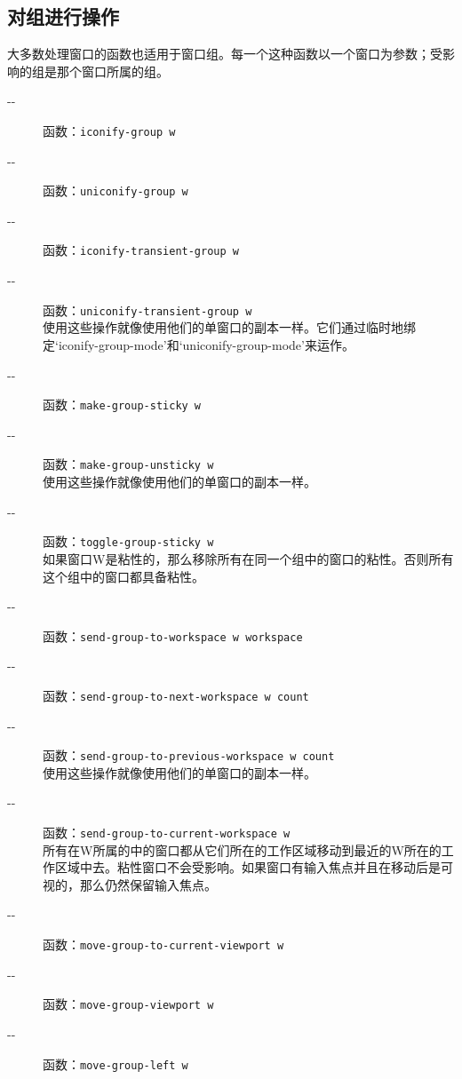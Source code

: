 \documentclass{book}
\begin{document}
\begin{CJK*}{UTF8}{gbsn}
\subsection{对组进行操作}
大多数处理窗口的函数也适用于窗口组。每一个这种函数以一个窗口为参数；受影响的组是那个窗口所属的组。
\begin{description}
\item[-{}-] 函数：\verb|iconify-group w|\\
\item[-{}-] 函数：\verb|uniconify-group w|\\
\item[-{}-] 函数：\verb|iconify-transient-group w|\\
\item[-{}-] 函数：\verb|uniconify-transient-group w|\\
使用这些操作就像使用他们的单窗口的副本一样。它们通过临时地绑定`iconify-group-mode'和`uniconify-group-mode'来运作。
\item[-{}-] 函数：\verb|make-group-sticky w|\\
\item[-{}-] 函数：\verb|make-group-unsticky w|\\
使用这些操作就像使用他们的单窗口的副本一样。
\item[-{}-] 函数：\verb|toggle-group-sticky w|\\
如果窗口W是粘性的，那么移除所有在同一个组中的窗口的粘性。否则所有这个组中的窗口都具备粘性。
\item[-{}-] 函数：\verb|send-group-to-workspace w workspace|\\
\item[-{}-] 函数：\verb|send-group-to-next-workspace w count|\\
\item[-{}-] 函数：\verb|send-group-to-previous-workspace w count|\\
使用这些操作就像使用他们的单窗口的副本一样。
\item[-{}-] 函数：\verb|send-group-to-current-workspace w|\\
所有在W所属的中的窗口都从它们所在的工作区域移动到最近的W所在的工作区域中去。粘性窗口不会受影响。如果窗口有输入焦点并且在移动后是可视的，那么仍然保留输入焦点。
\item[-{}-] 函数：\verb|move-group-to-current-viewport w|\\
\item[-{}-] 函数：\verb|move-group-viewport w|\\
\item[-{}-] 函数：\verb|move-group-left w|\\

\end{description}
\end{CJK*}
\end{document}
